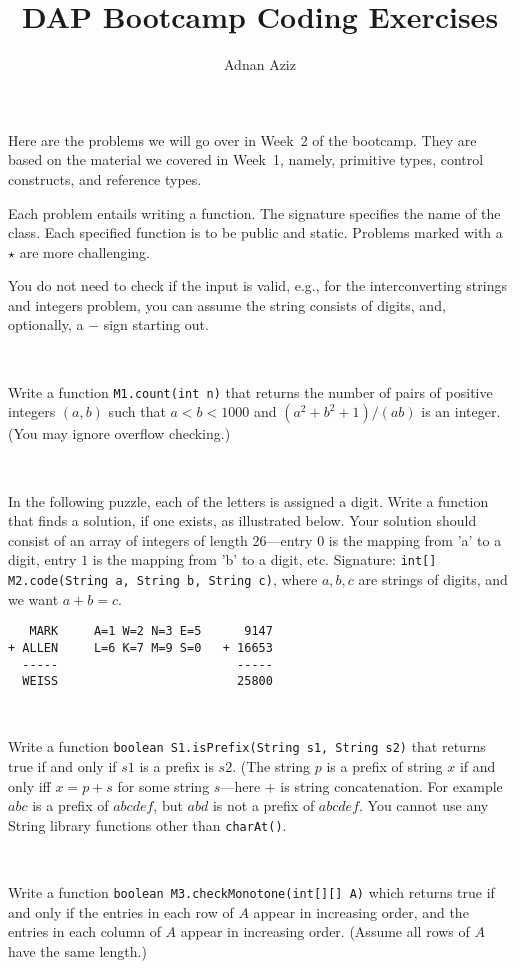 \documentclass{jhwhw}
\author{Adnan Aziz}
\title{DAP Bootcamp  Coding Exercises
}
\newcommand{\task}{%
\mbox{ }\\ %
\noindent{\bf Task:}
}
\begin{document}
\noindent
Here are the problems we will go over in Week~2 of the bootcamp.
They are based on the material we covered in Week~1, namely, primitive types,
control constructs, and reference types.

Each problem entails writing a function. The signature specifies 
the name of the class. Each specified function is to be public and static.
Problems marked with a $\star$ are more challenging.

You do not need to check if the input is valid, e.g., for the 
interconverting strings and integers problem, you can assume
the string consists of digits, and, optionally, a $-$ sign starting out.


\task
Write a function \texttt{M1.count(int n)} that returns the number of 
pairs of positive integers $(a,b)$ such that $a < b < 1000$ and 
$(a^2 + b^2 + 1)/(ab)$ is an integer. (You may ignore overflow checking.)


\task
In the following puzzle, each of the letters is assigned a digit. Write a function
that finds a solution, if one exists, as illustrated below. Your solution should consist of an
array of integers of length 26---entry $0$ is the mapping from 'a' to a digit, 
entry $1$ is the mapping from 'b' to a digit, etc.
Signature: \texttt{int[] M2.code(String a, String b, String c)}, where
$a,b,c$ are strings of digits, and we want $a + b = c$.

\begin{verbatim}
   MARK     A=1 W=2 N=3 E=5      9147
+ ALLEN     L=6 K=7 M=9 S=0   + 16653
  -----                         -----
  WEISS                         25800
\end{verbatim}


\task
Write a function \texttt{boolean S1.isPrefix(String s1, String s2)} that
returns true if and only if $s1$ is a prefix is $s2$. (The string $p$ is a
prefix of string $x$ if and only iff $x = p + s$ for some string $s$---here
$+$ is string concatenation. For example $abc$ is a prefix of $abcdef$,
but $abd$ is not a prefix of $abcdef$.
You cannot use any String library functions other than \texttt{charAt()}.


\task
Write a function \texttt{boolean M3.checkMonotone(int[][] A)}
which returns true if and only if the entries in each row
of $A$ appear in increasing order, and the entries in each
column of $A$ appear in increasing order.
(Assume all rows of $A$ have the same length.)
\end{document}

